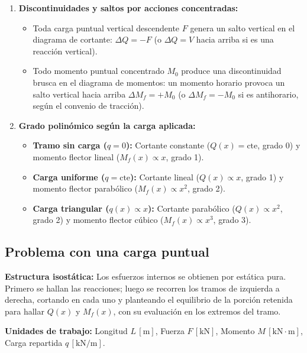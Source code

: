 {\begin{enumerate}
        \item \textbf{Discontinuidades y saltos por acciones concentradas:}
              \begin{itemize}
                  \item Toda carga puntual vertical descendente $F$ genera un salto vertical en el diagrama de cortante: $\Delta Q = -F$ (o $\Delta Q = V$ hacia arriba si es una reacción vertical).
                  \item Todo momento puntual concentrado $M_0$ produce una discontinuidad brusca en el diagrama de momentos: un momento horario provoca un salto vertical hacia arriba $\Delta M_f = +M_0$ (o $\Delta M_f = -M_0$ si es antihorario, según el convenio de tracción).
              \end{itemize}

        \item \textbf{Grado polinómico según la carga aplicada:}
              \begin{itemize}
                  \item \textbf{Tramo sin carga ($q = 0$):} Cortante constante ($Q(x) = \text{cte}$, grado 0) y momento flector lineal ($M_f(x) \propto x$, grado 1).
                  \item \textbf{Carga uniforme ($q = \text{cte}$):} Cortante lineal ($Q(x) \propto x$, grado 1) y momento flector parabólico ($M_f(x) \propto x^2$, grado 2).
                  \item \textbf{Carga triangular ($q(x) \propto x$):} Cortante parabólico ($Q(x) \propto x^2$, grado 2) y momento flector cúbico ($M_f(x) \propto x^3$, grado 3).
              \end{itemize}
    \end{enumerate}
}

\subsection{Problema con una carga puntual}

\begin{tcolorbox}[colback=white, colframe=myb!40, arc=4pt, boxrule=0.8pt, left=8pt, right=8pt, top=6pt, bottom=6pt]
    \textbf{Estructura isostática:} Los esfuerzos internos se obtienen por estática pura. Primero se hallan las reacciones; luego se recorren los tramos de izquierda a derecha, cortando en cada uno y planteando el equilibrio de la porción retenida para hallar $Q(x)$ y $M_f(x)$, con su evaluación en los extremos del tramo.\par\smallskip
    \small\textbf{Unidades de trabajo:} Longitud $L\,[\text{m}]$, Fuerza $F\,[\text{kN}]$, Momento $M\,[\text{kN}\cdot\text{m}]$, Carga repartida $q\,[\text{kN/m}]$.
\end{tcolorbox}



